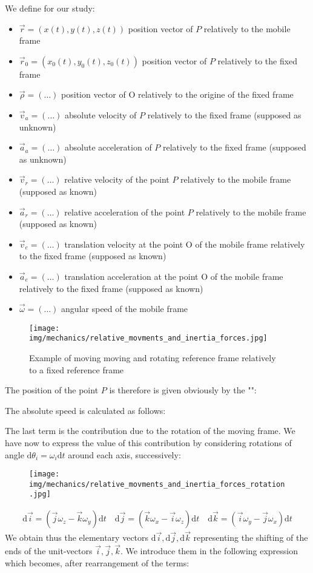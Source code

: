 	We define for our study:
	\begin{itemize}
		\item $\vec{r}=(x(t),y(t),z(t))$ position vector of $P$ relatively to the mobile frame
	\item $\vec{r}_0=(x_0(t),y_0(t),z_0(t))$ position vector of $P$ relatively to the fixed frame
		\item $\vec{\rho}=(\ldots)$ position vector of O relatively to the origine of the fixed frame
		\item $\vec{v}_a=(\ldots)$ absolute velocity of $P$ relatively to the fixed frame (supposed as unknown)
		\item $\vec{a}_a=(\ldots)$ absolute acceleration of $P$ relatively to the fixed frame (supposed as unknown)
		\item $\vec{v}_r=(\ldots)$ relative velocity of the point $P$ relatively to the mobile frame (supposed as known)
		\item $\vec{a}_r=(\ldots)$ relative acceleration of the point $P$ relatively to the mobile frame (supposed as known)
		\item $\vec{v}_e=(\ldots)$ translation velocity at the point O of the mobile frame relatively to the fixed frame (supposed as known)
		\item $\vec{a}_e=(\ldots)$ translation acceleration at the point O of the mobile frame relatively to the fixed frame (supposed as known)
		\item $\vec{\omega}=(\ldots)$ angular speed of the mobile frame
	\end{itemize}
	\begin{figure}[H]
		\centering
		\texttt{[image: img/mechanics/relative\_movments\_and\_inertia\_forces.jpg]}
		\caption{Example of moving moving and rotating reference frame relatively to a fixed reference frame}
	\end{figure}
	The position of the point $P$ is therefore is given obviously by the "":
	
	The absolute speed is calculated as follows:
	
	The last term is the contribution due to the rotation of the moving frame. We have now to express the value of this contribution by considering rotations of  angle $\mathrm{d}\theta_i=\omega_i\mathrm{d}t$ around each axis, successively:
	\begin{figure}[H]
		\centering
		\texttt{[image: img/mechanics/relative\_movments\_and\_inertia\_forces\_rotation.jpg]}
	\end{figure}
	\begin{gather*}
		\mathrm{d}\vec{i}=(\vec{j}\omega_z-\vec{k}\omega_y)\mathrm{d}t\quad \mathrm{d}\vec{j}=(\vec{k}\omega_x-\vec{i}\omega_z)\mathrm{d}t\quad \mathrm{d}\vec{k}=(\vec{i}\omega_y-\vec{j}\omega_x)\mathrm{d}t
	\end{gather*}
	We obtain thus the elementary vectors $\mathrm{d}\vec{i},\mathrm{d}\vec{j},\mathrm{d}\vec{k}$ representing the shifting of the ends of the unit-vectors $\vec{i},\vec{j},\vec{k}$. We introduce them in the following expression which becomes, after rearrangement of the terms:
	
